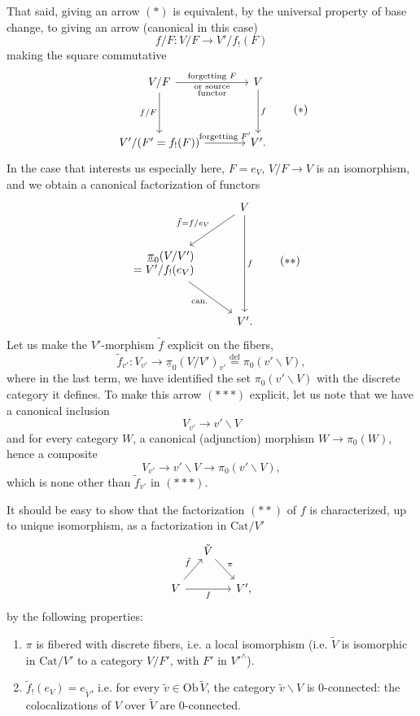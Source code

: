 \documentclass[11pt]{article}
\newcommand{\printedpage}[1]{\marginpar{\footnotesize p.~#1}}
\newcommand{\msp}[1]{\marginpar{\footnotesize [#1]}}
\newcommand{\defeq}{\overset{\text{def}}{=}}
\newcommand{\upi}{\underline{\pi}}
\newcommand{\Cat}{\mathrm{Cat}}
\newcommand{\Ob}{\mathrm{Ob}\,}
\begin{document}
That said, giving an arrow $(*)$ is equivalent, by the universal property of base change, to giving an arrow (canonical in this case)
\[ f/F : V/F \longrightarrow V'/f_!(F) \]
making the square commutative
\[
\begin{tikzcd}[column sep=large, row sep=huge]
V/F \arrow[r, "\text{forgetting }F", "\substack{\text{or source}\\ \text{functor}}"'] \arrow[d, "f/F"'] & V \arrow[d, "f"] \\
V'/(F' = f_!(F)) \arrow[r, "\text{forgetting }F'"] & V'.
\end{tikzcd}
\tag*{$(*)$}
\]
In the case that interests us especially here, $F = e_V$, $V/F \longrightarrow V$ is an isomorphism, and we obtain a canonical factorization of functors \msp{page 91}
\[
\begin{tikzcd}[row sep=large]
 & V \arrow[dl, "\tilde{f}=f/e_V"'] \arrow[dd, "f"] \\
\begin{array}{r} \upi_0(V/V') \\ = V'/f_!(e_V) \end{array} \arrow[dr, "\text{can.}"'] & \\
 & V'.
\end{tikzcd}
\tag*{$(**)$}
\]
Let us make the $V'$-morphism $\tilde{f}$ explicit on the fibers,
\[ \tilde{f}_{v'} : V_{v'} \longrightarrow \upi_0(V/V')_{v'} \defeq \pi_0(v'\backslash V), \tag*{$(***)$} \]
where in the last term, we have identified the set $\pi_0(v'\backslash V)$ with the discrete category it defines. To make this arrow $(***)$ explicit, let us note that we have a canonical inclusion
\[ V_{v'} \longrightarrow v'\backslash V \]
and for every category $W$, a canonical (adjunction) morphism $W \longrightarrow \pi_0(W)$, hence a composite
\[ V_{v'} \longrightarrow v'\backslash V \longrightarrow \pi_0(v'\backslash V), \]
which is none other than $\tilde{f}_{v'}$ in $(***)$.

It should be easy to show that the factorization $(**)$ of $f$ is characterized, up to unique isomorphism, as a
\printedpage{65}
\msp{page 92}
factorization in $\Cat/V'$
\[
\begin{tikzcd}[column sep=small]
 & \tilde{V} \arrow[dr, "\pi"] & \\
V \arrow[ur, "\tilde{f}"] \arrow[rr, "f"'] & & V',
\end{tikzcd}
\]
by the following properties:
\begin{enumerate}[label={}, leftmargin=*]
\item[a)] $\pi$ is fibered with discrete fibers, i.e. a local isomorphism (i.e. $\tilde{V}$ is isomorphic in $\Cat/V'$ to a category $V/F'$, with $F'$ in $V'^{\wedge}$). %
\item[b)] $\tilde{f}_!(e_V) = e_{\tilde{V}}$, i.e. for every $\tilde{v} \in \Ob \tilde{V}$, the category $\tilde{v}\backslash V$ is 0-connected: the colocalizations of $V$ over $\tilde{V}$ are 0-connected. %
\end{enumerate}
\end{document}
